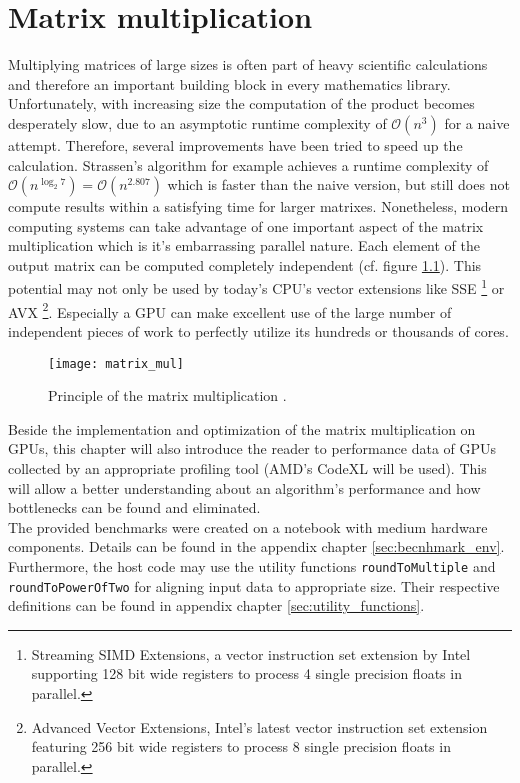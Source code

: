 \chapter{Matrix multiplication}
\label{sec:matrix_mul}

Multiplying matrices of large sizes is often part of heavy scientific calculations and therefore an important building block in every mathematics library. Unfortunately, with increasing size the computation of the product becomes desperately slow, due to an asymptotic runtime complexity of $\mathcal{O}(n^3)$ for a naive attempt. Therefore, several improvements have been tried to speed up the calculation. Strassen's algorithm for example achieves a runtime complexity of $\mathcal{O}(n^{\log_2 7}) = \mathcal{O}(n^{2.807})$ \cite{strassen} which is faster than the naive version, but still does not compute results within a satisfying time for larger matrixes.
Nonetheless, modern computing systems can take advantage of one important aspect of the matrix multiplication which is it's embarrassing parallel nature. Each element of the output matrix can be computed completely independent (cf. figure \ref{fig:matrix_mul}). This potential may not only be used by today's CPU's vector extensions like SSE \footnote{Streaming SIMD Extensions, a vector instruction set extension by Intel supporting 128 bit wide registers to process 4 single precision floats in parallel.} or AVX \footnote{Advanced Vector Extensions, Intel's latest vector instruction set extension featuring 256 bit wide registers to process 8 single precision floats in parallel.}. Especially a GPU can make excellent use of the large number of independent pieces of work to perfectly utilize its hundreds or thousands of cores.

\begin{figure}
\centering
\texttt{[image: matrix\_mul]}
\caption{Principle of the matrix multiplication \cite{wiki_matrix_mul}.}
\label{fig:matrix_mul}
\end{figure}

Beside the implementation and optimization of the matrix multiplication on GPUs, this chapter will also introduce the reader to performance data of GPUs collected by an appropriate profiling tool (AMD's CodeXL will be used). This will allow a better understanding about an algorithm's performance and how bottlenecks can be found and eliminated. \\
The provided benchmarks were created on a notebook with medium hardware components. Details can be found in the appendix chapter \ref{sec:becnhmark_env}. Furthermore, the host code may use the utility functions \lstinline!roundToMultiple! and \lstinline!roundToPowerOfTwo! for aligning input data to appropriate size. Their respective definitions can be found in appendix chapter \ref{sec:utility_functions}.

